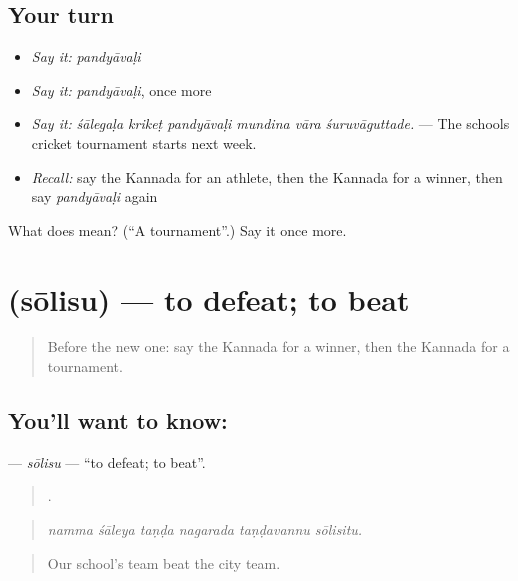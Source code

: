 \subsection*{Your turn}
\begin{itemize}
\raggedright
  \item \emph{Say it:} \emph{pandyāvaḷi}
  \item \emph{Say it:} \emph{pandyāvaḷi}, once more
  \item \emph{Say it:} \emph{śālegaḷa krikeṭ pandyāvaḷi mundina vāra śuruvāguttade.} — The schools cricket tournament starts next week.
  \item \emph{Recall:} say the Kannada for an athlete, then the Kannada for a winner, then say \emph{pandyāvaḷi} again
\end{itemize}

\begin{tcolorbox}[breakable,colback=teal!4,colframe=teal!35!black,title={Before you move on}]
What does  mean? (\textquotedblleft{}A tournament\textquotedblright{}.) Say it once more.
\end{tcolorbox}
\section[\texorpdfstring{\kn{ಸೋಲಿಸು} (sōlisu)}{ಸೋಲಿಸು (sōlisu)}]{ (sōlisu) — to defeat; to beat}

\label{lesson:KA-C538-solisu}



\begin{quote}
Before the new one: say the Kannada for a winner, then the Kannada for a tournament.
\end{quote}

\subsection*{You'll want to know: }
\textbf{} — \emph{sōlisu} — \textquotedblleft{}to defeat; to beat\textquotedblright{}.

\begin{quote}
     .
\end{quote}

\begin{quote}
\emph{namma śāleya taṇḍa nagarada taṇḍavannu sōlisitu.}
\end{quote}

\begin{quote}
Our school's team beat the city team.
\end{quote}

